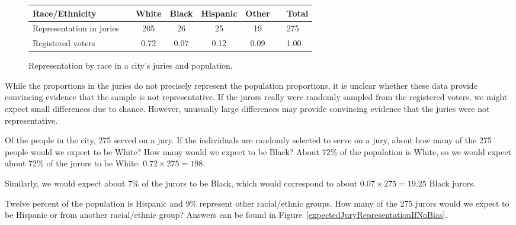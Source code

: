 \begin{figure}[h]
\centering
\begin{tabular}{ll ccc c ll}
\hline
Race/Ethnicity	 & \hspace{2mm} & White & Black & Hispanic & Other & \hspace{2mm} & Total \\
\hline
Representation in juries &	& 205 & 26 & 25 & 19 & & 275 \\
Registered voters	 & 		& 0.72 & 0.07 & 0.12 & 0.09 & & 1.00 \\
\hline
\end{tabular}
\caption{Representation by race in a city's juries and population.}
\label{juryRepresentationAndCityRepresentationForRace}
\end{figure}

While the proportions in the juries do not precisely represent the population proportions, it is unclear whether these data provide convincing evidence that the sample is not representative. If the jurors really were randomly sampled from the registered voters, we might expect small differences due to chance. However, unusually large differences may provide convincing evidence that the juries were not representative.

\begin{examplewrap}
\begin{nexample}{Of the people in the city, 275 served on a jury. If the individuals are randomly selected to serve on a jury, about how many of the 275 people would we expect to be White? How many would we expect to be Black?}
About 72\% of the population is White, so we would expect about 72\% of the jurors to be White: $0.72\times 275 = 198$.

Similarly, we would expect about 7\% of the jurors to be Black, which would correspond to about $0.07\times 275 = 19.25$ Black jurors.
\end{nexample}
\end{examplewrap}

\begin{exercisewrap}
\begin{nexercise}
Twelve percent of the population is Hispanic and 9\% represent other racial/ethnic groups. How many of the 275 jurors would we expect to be Hispanic or from another racial/ethnic group? Answers can be found in Figure~\ref{expectedJuryRepresentationIfNoBias}.
\end{nexercise}
\end{exercisewrap}

